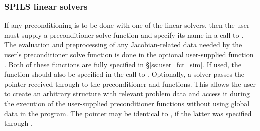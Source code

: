 \subsubsection{SPILS linear solvers}\label{sss:optin_spils}
If any preconditioning is to be done with one of the {\cvspils} linear
solvers, then the user must supply a preconditioner solve function 
and specify its name in a call to .
The evaluation and preprocessing of any Jacobian-related data needed
by the user's preconditioner solve function is done in the optional
user-supplied function . Both of these functions are
fully specified in \S\ref{ss:user_fct_sim}.
If used, the  function should also be specified in the call to
.
Optionally, a {\cvspils} solver passes the pointer 
received through  to the preconditioner
 and  functions.  This allows the user to create
an arbitrary structure with relevant problem data and access it during
the execution of the user-supplied preconditioner functions without using
global data in the program.  The pointer  may be identical
to , if the latter was specified through .

